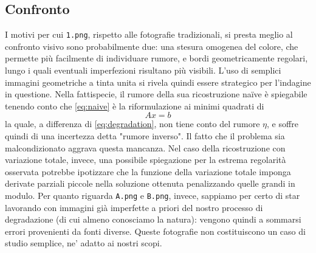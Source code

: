 \documentclass[a4paper]{article}
\begin{document}
\subsection{Confronto}
I motivi per cui \verb!1.png!, rispetto alle fotografie tradizionali, si presta
meglio al confronto visivo sono probabilmente due: una stesura omogenea del
colore, che permette più facilmente di individuare rumore, e bordi
geometricamente regolari, lungo i quali eventuali imperfezioni risultano più
visibili. L'uso di semplici immagini geometriche a tinta unita si rivela quindi
essere strategico per l'indagine in questione. Nella fattispecie, il rumore
della sua ricostruzione naïve è spiegabile tenendo conto che \ref{eq:naive} è la
riformulazione ai minimi quadrati di
\begin{equation}
  Ax = b
\end{equation}
la quale, a differenza di \ref{eq:degradation}, non tiene conto del rumore
$\eta$, e soffre quindi di una incertezza detta "rumore inverso". Il fatto che
il problema sia malcondizionato aggrava questa mancanza. Nel caso della
ricostruzione con variazione totale, invece, una possibile spiegazione per la
estrema regolarità osservata potrebbe ipotizzare che la funzione della
variazione totale imponga derivate parziali piccole nella soluzione ottenuta
penalizzando quelle grandi in modulo. Per quanto riguarda \verb!A.png! e
\verb!B.png!, invece, sappiamo per certo di star lavorando con immagini già
imperfette a priori del nostro processo di degradazione (di cui almeno
conosciamo la natura): vengono quindi a sommarsi errori provenienti da fonti
diverse. Queste fotografie non costituiscono un caso di studio semplice,
ne' adatto ai nostri scopi.
\end{document}
